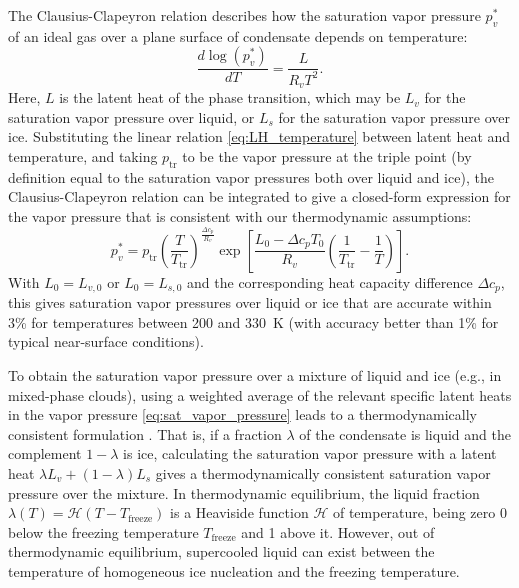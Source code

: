 \documentclass{article}
\begin{document}
The Clausius-Clapeyron relation describes how the saturation vapor pressure $p_v^*$ of an ideal gas over a plane surface of condensate depends on temperature:
\begin{equation}
    \frac{d \log(p_v^*)}{dT} = \frac{L}{R_v T^2}.
\end{equation}
Here, $L$ is the latent heat of the phase transition, which may be $L_v$ for the saturation vapor pressure over liquid, or $L_s$ for the saturation vapor pressure over ice. Substituting the linear relation \eqref{eq:LH_temperature} between latent heat and temperature, and taking $p_\mathrm{tr}$ to be the vapor pressure at the triple point (by definition equal to the saturation vapor pressures both over liquid and ice), the Clausius-Clapeyron relation can be integrated to give a closed-form expression for the vapor pressure that is consistent with our thermodynamic assumptions:
\begin{equation}
    p_v^* = p_{\mathrm{tr}} \left( \frac{T}{T_{\mathrm{tr}}} \right)^{\frac{\Delta c_p}{R_v}}
        \exp \left[ \frac{L_0 - \Delta c_p T_0}{R_v} 
        \left( \frac{1}{T_{\mathrm{tr}}} - \frac{1}{T} \right) \right].
        \label{eq:sat_vapor_pressure}
\end{equation}
With $L_0 = L_{v,0}$ or $L_0 = L_{s,0}$ and the corresponding heat capacity difference $\Delta c_p$, this gives saturation vapor pressures over liquid or ice that are accurate within 3\% for temperatures between 200 and 330~K (with accuracy better than 1\% for typical near-surface conditions).

To obtain the saturation vapor pressure over a mixture of liquid and ice (e.g., in mixed-phase clouds), using a weighted average of the relevant specific latent heats in the vapor pressure \eqref{eq:sat_vapor_pressure} leads to a thermodynamically consistent formulation \citep{Pressel15a}. That is, if a fraction $\lambda$ of the condensate is liquid and the complement $1-\lambda$ is ice, calculating the saturation vapor pressure with a latent heat $\lambda L_v + (1-\lambda)L_s$ gives a thermodynamically consistent saturation vapor pressure over the mixture. In thermodynamic equilibrium, the liquid fraction $\lambda(T) = \mathcal{H}(T-T_{\mathrm{freeze}})$ is a Heaviside function $\mathcal{H}$ of temperature, being zero 0 below the freezing temperature $T_{\mathrm{freeze}}$ and 1 above it. However, out of thermodynamic equilibrium, supercooled liquid can exist between the temperature of homogeneous ice nucleation and the freezing temperature.
\end{document}

